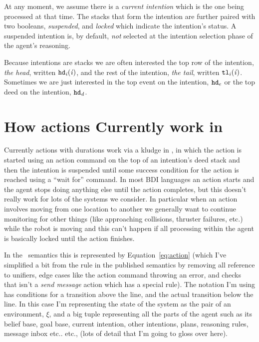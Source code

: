 \documentclass{blue-book}
\begin{document}
At any moment, we assume there is a \emph{current intention} which is
the one being processed at that time. 
The stacks that form the intention are further paired with two booleans, \emph{suspended}, and \emph{locked}
which indicate the intention's status.
A suspended intention is, by default, \emph{not}
selected at the intention selection phase of the agent's reasoning.  

Because intentions are stacks we are often interested the top row of the intention, \emph{the head}, written ${\tt hd}_{\mathit{i}}(\mathit{i})$, and the rest of the intention, \emph{the tail}, written ${\tt tl}_i(\mathit{i})$.  Sometimes we are just interested in the top event on the intention, ${\tt hd}_e$ or the top deed on the intention, $\mathit{{\tt hd}_d}$.

\section{How actions Currently work in \gwendolen}
Currently actions with durations work via a kludge in \gwendolen, in which the action is started using an action command on the top of an intention's deed stack and then the intention is suspended until some success condition for the action is  reached using a ``wait for'' command.  In most BDI languages an action starts and the agent stops doing anything else until the action completes, but this doesn't really work for lots of the systems we consider.  In particular when an action involves moving from one location to another we generally want to continue monitoring for other things (like approaching collisions, thruster failures, etc.) while the robot is moving and this can't happen if all processing within the agent is basically locked until the action finishes.

In the \gwendolen\ semantics this is represented by Equation~\eqref{eq:action} (which I've simplified a bit from the rule in the published semantics by removing all reference to unifiers, edge cases like the action command throwing an error, and checks that isn't a \emph{send message} action which has a special rule).  The notation I'm using has conditions for a transition above the line, and the actual transition below the line.  In this case I'm representing the state of the system as the pair of an environment, $\xi$, and a big tuple representing all the parts of the agent such as its belief base, goal base, current intention, other intentions, plans, reasoning rules, message inbox etc.. etc., (lots of detail that I'm going to gloss over here).
\end{document}
